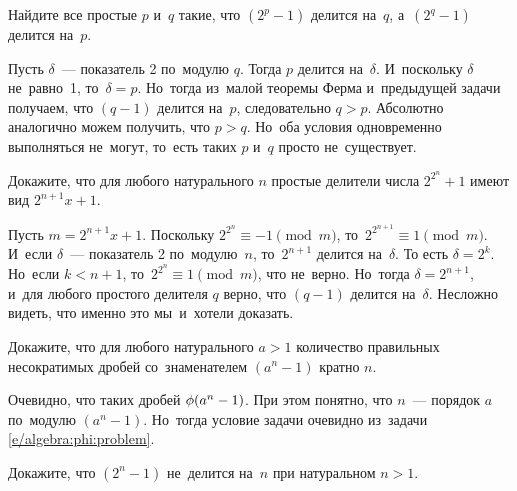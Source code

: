 \begin{problems}

\item
Найдите все простые $p$ и~$q$ такие, что $(2^p - 1)$ делится на~$q$,
а~$(2^q - 1)$ делится на~$p$.

\end{problems}

\ifincludesolutions
Пусть $\delta$~--- показатель 2 по~модулю $q$.
Тогда $p$ делится на~$\delta$.
И~поскольку $\delta$ не~равно~1, то~$\delta = p$.
Но~тогда из~малой теоремы Ферма и~предыдущей задачи получаем, что $(q - 1)$
делится на~$p$, следовательно $q > p$.
Абсолютно аналогично можем получить, что $p > q$.
Но~оба условия одновременно выполняться не~могут, то~есть таких $p$ и~$q$
просто не~существует.
\fi %

\begin{problems}

\item
Докажите, что для любого натурального $n$ простые делители числа $2^{2^n} + 1$
имеют вид $2^{n+1} x + 1$.

\end{problems}

\ifincludesolutions
Пусть $m = 2^{n+1} x + 1$.
Поскольку $2^{2^n} \equiv -1 \pmod{m}$, то~$2^{2^{n+1}} \equiv 1 \pmod{m}$.
И~если $\delta$~--- показатель 2 по~модулю~$n$, то~$2^{n+1}$ делится
на~$\delta$.
То есть $\delta = 2^k$.
Но~если $k < n + 1$, то~$2^{2^n} \equiv 1 \pmod{m}$, что не~верно.
Но~тогда $\delta = 2^{n+1}$, и~для любого простого делителя $q$ верно, что
$(q - 1)$ делится на~$\delta$.
Несложно видеть, что именно это мы~и~хотели доказать.
\fi %

\begin{problems}

\item
Докажите, что для любого натурального $a > 1$ количество правильных
несократимых дробей со~знаменателем $(a^n - 1)$ кратно $n$.

\end{problems}

\ifincludesolutions
Очевидно, что таких дробей $\mathrm{\phi}(a^n - 1)$.
При этом понятно, что $n$~--- порядок $a$ по~модулю $(a^n - 1)$.
Но~тогда условие задачи очевидно из~задачи \ref{e/algebra:phi:problem}.
\fi %

\begin{problems}


\item
Докажите, что $(2^n - 1)$ не~делится на~$n$ при натуральном $n > 1$.

\end{problems}

